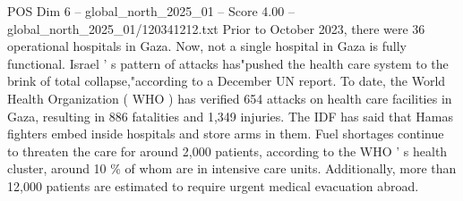\begin{textsample}{POS Dim 6 – global\_north\_2025\_01 – Score 4.00 – global\_north\_2025\_01/120341212.txt}
Prior to October 2023, there were 36 operational hospitals in Gaza.
Now, not a single hospital in Gaza is fully functional.
Israel ' s pattern of attacks has"pushed the health care system to the brink of total collapse,"according to a December UN report.
To date, the World Health Organization ( WHO ) has verified 654 attacks on health care facilities in Gaza, resulting in 886 fatalities and 1,349 injuries.
The IDF has said that Hamas fighters embed inside hospitals and store arms in them.
Fuel shortages continue to threaten the care for around 2,000 patients, according to the WHO ' s health cluster, around 10 \% of whom are in intensive care units.
Additionally, more than 12,000 patients are estimated to require urgent medical evacuation abroad.

\end{textsample}

